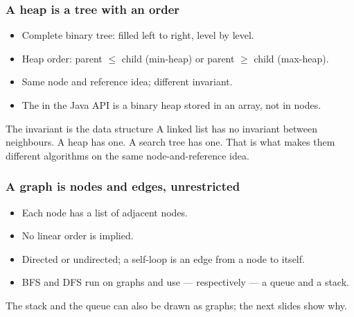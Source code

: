 \documentclass[aspectratio=169,10pt,compress]{beamer}
\begin{document}
\begin{frame}[t,fragile] \frametitle{A heap is a tree with an order}
  \begin{itemize}\small
    \item Complete binary tree: filled left to right, level by level.
    \item Heap order: parent $\le$ child (min-heap) or parent $\ge$ child (max-heap).
    \item Same node and reference idea; different invariant.
    \item The  in the Java API is a binary heap
          stored in an array, not in nodes.
  \end{itemize}
  \begin{block}{The invariant is the data structure}
    \small
    A linked list has no invariant between neighbours.
    A heap has one. A search tree has one. That is what makes them
    different algorithms on the same node-and-reference idea.
  \end{block}
\end{frame}




\begin{frame}[t,fragile] \frametitle{A graph is nodes and edges, unrestricted}
  \begin{itemize}\small
    \item Each node has a list of adjacent nodes.
    \item No linear order is implied.
    \item Directed or undirected; a self-loop is an edge from a node to itself.
    \item BFS and DFS run on graphs and use --- respectively --- a queue and a stack.
  \end{itemize}
  \vspace{0.3em}
  \small
  The stack and the queue can also be drawn as graphs; the next slides show why.
\end{frame}

\end{document}
